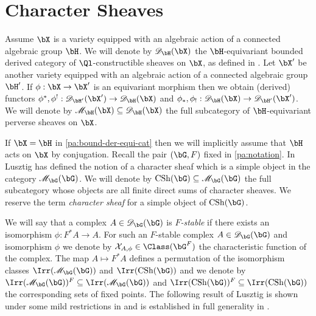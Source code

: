 \documentclass[eqthmnum,nocolour,skinny]{jt-calcs}
\DeclareMathOperator{\CS}{CSh}
\begin{document}
\section{Character Sheaves}\label{sec:char-sheaves}
\begin{pa}\label{pa:bound-der-equi-cat}
Assume $\bX$ is a variety equipped with an algebraic action of a connected algebraic group $\bH$. We will denote by $\mathscr{D}_{\bH}(\bX)$ the $\bH$-equivariant bounded derived category of $\Ql$-constructible sheaves on $\bX$, as defined in \cite{bernstein-lunts:1994:equivariant-sheaves}. Let $\bX'$ be another variety equipped with an algebraic action of a connected algebraic group $\bH'$. If $\phi : \bX \to \bX'$ is an equivariant morphism then we obtain (derived) functors $\phi^*,\phi^! : \mathscr{D}_{\bH'}(\bX') \to \mathscr{D}_{\bH}(\bX)$ and $\phi_*,\phi_! : \mathscr{D}_{\bH}(\bX) \to \mathscr{D}_{\bH'}(\bX')$. We will denote by $\mathscr{M}_{\bH}(\bX) \subseteq \mathscr{D}_{\bH}(\bX)$ the full subcategory of $\bH$-equivariant perverse sheaves on $\bX$.
\end{pa}

\begin{pa}
If $\bX = \bH$ in \cref{pa:bound-der-equi-cat} then we will implicitly assume that $\bH$ acts on $\bX$ by conjugation. Recall the pair $(\bG,F)$ fixed in \cref{pa:notation}. In \cite[2.10]{lusztig:1985:character-sheaves} Lusztig has defined the notion of a character sheaf which is a simple object in the category $\mathscr{M}_{\bG}(\bG)$. We will denote by $\CS(\bG) \subseteq \mathscr{M}_{\bG}(\bG)$ the full subcategory whose objects are all finite direct sums of character sheaves. We reserve the term \emph{character sheaf} for a simple object of $\CS(\bG)$.
\end{pa}

\begin{pa}
We will say that a complex $A \in \mathscr{D}_{\bG}(\bG)$ is \emph{$F$-stable} if there exists an isomorphism $\phi : F^*A \to A$. For such an $F$-stable complex $A \in \mathscr{D}_{\bG}(\bG)$ and isomorphism $\phi$ we denote by $\mathcal{X}_{A,\phi} \in \Class(\bG^F)$ the characteristic function of the complex. The map $A \mapsto F^*A$ defines a permutation of the isomorphism classes $\Irr(\mathscr{M}_{\bG}(\bG))$ and $\Irr(\CS(\bG))$ and we denote by $\Irr(\mathscr{M}_{\bG}(\bG))^F \subseteq \Irr(\mathscr{M}_{\bG}(\bG))$ and $\Irr(\CS(\bG))^F \subseteq \Irr(\CS(\bG))$ the corresponding sets of fixed points. The following result of Lusztig is shown under some mild restrictions in \cite[\S25]{lusztig:1985:character-sheaves} and is established in full generality in \cite{lusztig:2012:on-the-cleanness}.
\end{pa}
\end{document}
